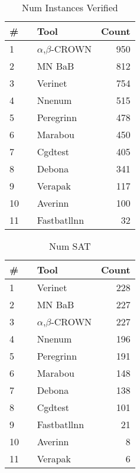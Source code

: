 
\begin{table}[h]
\begin{center}
\caption{Num Instances Verified} \label{tab:stats1}
{\setlength{\tabcolsep}{2pt}
\begin{tabular}[h]{@{}llr@{}}
\toprule
\textbf{\# ~} & \textbf{Tool} & \textbf{Count}\\
\midrule
1 & $\alpha$,$\beta$-CROWN & 950 \\
2 & MN BaB & 812 \\
3 & Verinet & 754 \\
4 & Nnenum & 515 \\
5 & Peregrinn & 478 \\
6 & Marabou & 450 \\
7 & Cgdtest & 405 \\
8 & Debona & 341 \\
9 & Verapak & 117 \\
10 & Averinn & 100 \\
11 & Fastbatllnn & 32 \\
\bottomrule
\end{tabular}
}
\end{center}
\end{table}




\begin{table}[h]
\begin{center}
\caption{Num SAT} \label{tab:stats2}
{\setlength{\tabcolsep}{2pt}
\begin{tabular}[h]{@{}llr@{}}
\toprule
\textbf{\# ~} & \textbf{Tool} & \textbf{Count}\\
\midrule
1 & Verinet & 228 \\
2 & MN BaB & 227 \\
3 & $\alpha$,$\beta$-CROWN & 227 \\
4 & Nnenum & 196 \\
5 & Peregrinn & 191 \\
6 & Marabou & 148 \\
7 & Debona & 138 \\
8 & Cgdtest & 101 \\
9 & Fastbatllnn & 21 \\
10 & Averinn & 8 \\
11 & Verapak & 6 \\
\bottomrule
\end{tabular}
}
\end{center}
\end{table}




